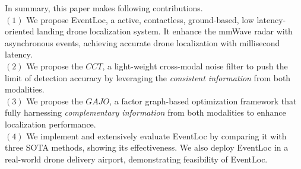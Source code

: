In summary, this paper makes following contributions.\\
\noindent $(1)$ We propose EventLoc, a active, contactless, ground-based, low latency-oriented landing drone localization system. 
It enhance the mmWave radar with asynchronous events, achieving accurate drone localization with millisecond latency. \\
\noindent $(2)$ We propose the $CCT$, a light-weight cross-modal noise filter to push the limit of detection accuracy by leveraging the \textit{consistent information} from both modalities. \\
\noindent $(3)$  We propose the $GAJO$, a factor graph-based optimization framework that fully harnessing \textit{complementary information} from both modalities to enhance localization performance.\\
\noindent $(4)$ We implement and extensively evaluate EventLoc by comparing it with three SOTA methods, showing its effectiveness. We also deploy EventLoc in a real-world drone delivery airport, demonstrating feasibility of EventLoc.